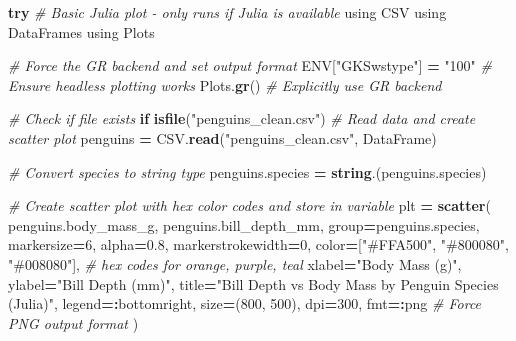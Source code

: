 \documentclass[
  11pt,
]{article}
\newenvironment{Shaded}{\begin{snugshade}}{\end{snugshade}}
\newcommand{\BuiltInTok}[1]{#1}
\newcommand{\CommentTok}[1]{\textcolor[rgb]{0.56,0.35,0.01}{\textit{#1}}}
\newcommand{\ConstantTok}[1]{\textcolor[rgb]{0.56,0.35,0.01}{#1}}
\newcommand{\ControlFlowTok}[1]{\textcolor[rgb]{0.13,0.29,0.53}{\textbf{#1}}}
\newcommand{\FloatTok}[1]{\textcolor[rgb]{0.00,0.00,0.81}{#1}}
\newcommand{\FunctionTok}[1]{\textcolor[rgb]{0.13,0.29,0.53}{\textbf{#1}}}
\newcommand{\ImportTok}[1]{#1}
\newcommand{\NormalTok}[1]{#1}
\newcommand{\OperatorTok}[1]{\textcolor[rgb]{0.81,0.36,0.00}{\textbf{#1}}}
\newcommand{\StringTok}[1]{\textcolor[rgb]{0.31,0.60,0.02}{#1}}
\begin{document}
\begin{Shaded}
\begin{Highlighting}[]
\ControlFlowTok{try}
    \CommentTok{\# Basic Julia plot {-} only runs if Julia is available}
    \ImportTok{using} \BuiltInTok{CSV}
    \ImportTok{using} \BuiltInTok{DataFrames}
    \ImportTok{using} \BuiltInTok{Plots}
    
    \CommentTok{\# Force the GR backend and set output format}
    \ConstantTok{ENV}\NormalTok{[}\StringTok{"GKSwstype"}\NormalTok{] }\OperatorTok{=} \StringTok{"100"}  \CommentTok{\# Ensure headless plotting works}
\NormalTok{    Plots.}\FunctionTok{gr}\NormalTok{()  }\CommentTok{\# Explicitly use GR backend}
    
    \CommentTok{\# Check if file exists}
    \ControlFlowTok{if} \FunctionTok{isfile}\NormalTok{(}\StringTok{"penguins\_clean.csv"}\NormalTok{)}
        \CommentTok{\# Read data and create scatter plot}
\NormalTok{        penguins }\OperatorTok{=}\NormalTok{ CSV.}\FunctionTok{read}\NormalTok{(}\StringTok{"penguins\_clean.csv"}\NormalTok{, DataFrame)}
        
        \CommentTok{\# Convert species to string type}
\NormalTok{        penguins.species }\OperatorTok{=} \FunctionTok{string}\NormalTok{.(penguins.species)}
        
        \CommentTok{\# Create scatter plot with hex color codes and store in variable}
\NormalTok{        plt }\OperatorTok{=} \FunctionTok{scatter}\NormalTok{(}
\NormalTok{            penguins.body\_mass\_g,}
\NormalTok{            penguins.bill\_depth\_mm,}
\NormalTok{            group}\OperatorTok{=}\NormalTok{penguins.species,}
\NormalTok{            markersize}\OperatorTok{=}\FloatTok{6}\NormalTok{,}
\NormalTok{            alpha}\OperatorTok{=}\FloatTok{0.8}\NormalTok{,}
\NormalTok{            markerstrokewidth}\OperatorTok{=}\FloatTok{0}\NormalTok{,}
\NormalTok{            color}\OperatorTok{=}\NormalTok{[}\StringTok{"\#FFA500"}\NormalTok{, }\StringTok{"\#800080"}\NormalTok{, }\StringTok{"\#008080"}\NormalTok{],  }\CommentTok{\# hex codes for orange, purple, teal}
\NormalTok{            xlabel}\OperatorTok{=}\StringTok{"Body Mass (g)"}\NormalTok{,}
\NormalTok{            ylabel}\OperatorTok{=}\StringTok{"Bill Depth (mm)"}\NormalTok{,}
\NormalTok{            title}\OperatorTok{=}\StringTok{"Bill Depth vs Body Mass by Penguin Species (Julia)"}\NormalTok{,}
\NormalTok{            legend}\OperatorTok{=:}\NormalTok{bottomright,}
\NormalTok{            size}\OperatorTok{=}\NormalTok{(}\FloatTok{800}\NormalTok{, }\FloatTok{500}\NormalTok{),}
\NormalTok{            dpi}\OperatorTok{=}\FloatTok{300}\NormalTok{,}
\NormalTok{            fmt}\OperatorTok{=:}\NormalTok{png  }\CommentTok{\# Force PNG output format}
\NormalTok{        )}
        

\end{Highlighting}
\end{Shaded}
\end{document}
